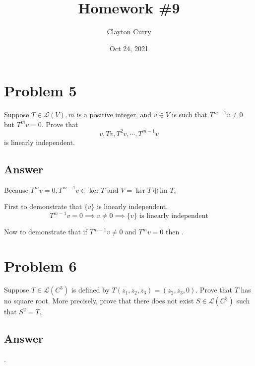 \documentclass[
	12pt, %
]{fphw}
\title{Homework \#9} %
\author{Clayton Curry} %
\date{Oct 24, 2021} %
\institute{University of Oklahoma \\ Department of Mathematics} %
\newcommand\0{\mathbf{0}}
\newcommand\set[1]{\{#1\}}
\renewcommand\L[1]{\mathcal{L}(#1)}
\begin{document}
\maketitle %

\section*{Problem 5}
\begin{problem}
Suppose $T \in \L{V}, m$ is a positive integer, and $v \in V$ is such that
$T^{m-1} v \ne 0$ but $T^m v = 0$. Prove that
$$
v, T v, T^2 v, \cdots, T^{m-1}v
$$
is linearly independent.
\end{problem}

\subsection*{Answer} Because $T^m v = 0, T^{m-1} v \in \ker T$ and $V = \ker T \oplus \text{im }  T$, 

First to demonstrate that $\set v$ is linearly independent. 
$$T^{m-1} v = 0 \implies v \ne 0 \implies \set v \text{ is linearly independent}$$

Now to demonstrate that if $T^{m-1}v \ne 0$ and $T^m v = 0$ then .

\newpage
\section*{Problem 6}
\begin{problem}
Suppose $T \in \L{C^3}$ is defined by $T (z_1, z_2, z_3) = (z_2, z_3,0)$. Prove
that $T$ has no square root. More precisely, prove that there does not exist
$S \in \L{C^3}$ such that $S^2 = T$.
\end{problem}

\subsection*{Answer} .

\newpage
\end{document}
